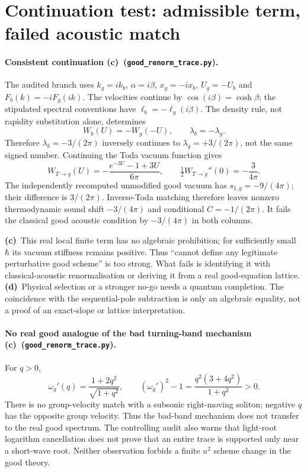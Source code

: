 \documentclass[11pt,a4paper]{article}
\newcommand{\C}{\textbf{(c)}\ }
\newcommand{\D}{\textbf{(d)}\ }
\newcommand{\file}[1]{\nolinkurl{#1}}
\newcommand{\trc}{\file{good_renorm_trace.py}}
\begin{document}
\section{Continuation test: admissible term, failed acoustic match}
\paragraph{Consistent continuation \C (\trc).}
The audited branch uses $k_g=ik_b$, $\alpha=i\beta$, $x_g=-ix_b$,
$U_g=-U_b$ and $F_b(k)=-iF_g(ik)$.
The velocities continue by $\cos(i\beta)=\cosh\beta$; the stipulated
spectral conventions have $\ell_b=-\ell_g(i\beta)$.
The density rule, not rapidity substitution alone, determines
\begin{equation}
 W_b(U)=-W_g(-U),\qquad \lambda_b=-\lambda_g.
\end{equation}
Therefore $\lambda_b=-3/(2\pi)$ inversely continues to
$\lambda_g=+3/(2\pi)$, not the same signed number.
Continuing the Toda vacuum function gives
\begin{equation}
 W_{T\to g}(U)=-\frac{e^{-3U}-1+3U}{6\pi},\qquad
 \tfrac12W_{T\to g}''(0)=-\frac3{4\pi}.
\end{equation}
The independently recomputed unmodified good vacuum has
$s_{1,g}=-9/(4\pi)$; their difference is $3/(2\pi)$.
Inverse-Toda matching therefore leaves nonzero thermodynamic sound shift
$-3/(4\pi)$ and conditional $C=-1/(2\pi)$. It fails the classical good
acoustic condition by $-3/(4\pi)$ in both columns.

\C This real local finite term has no algebraic prohibition; for
sufficiently small $\hbar$ its vacuum stiffness remains positive. Thus
``cannot define any legitimate perturbative good scheme'' is too strong.
What fails is identifying it with classical-acoustic renormalisation or
deriving it from a real good-equation lattice.
\D Physical selection or a stronger no-go needs a quantum completion.
The coincidence with the sequential-pole subtraction is only an algebraic
equality, not a proof of an exact-slope or lattice interpretation.

\paragraph{No real good analogue of the bad turning-band mechanism
\C (\trc).}
For $q>0$,
\begin{equation}
 \omega_g'(q)=\frac{1+2q^2}{\sqrt{1+q^2}},\qquad
 (\omega_g')^2-1=\frac{q^2(3+4q^2)}{1+q^2}>0.
\end{equation}
There is no group-velocity match with a subsonic right-moving soliton;
negative $q$ has the opposite group velocity. Thus the bad-band mechanism
does not transfer to the real good spectrum. The controlling audit also
warns that light-root logarithm cancellation does not prove that an entire
trace is supported only near a short-wave root. Neither observation
forbids a finite $u^2$ scheme change in the good theory.
\end{document}
